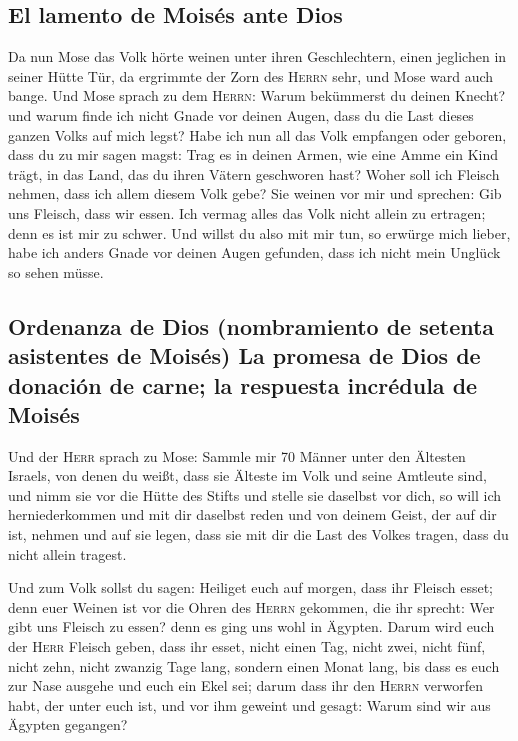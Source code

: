\hypertarget{el-lamento-de-moisuxe9s-ante-dios}{%
\subsection{El lamento de Moisés ante
Dios}\label{el-lamento-de-moisuxe9s-ante-dios}}

 Da nun Mose das Volk hörte weinen unter ihren
Geschlechtern, einen jeglichen in seiner Hütte Tür, da ergrimmte der
Zorn des \textsc{Herrn} sehr, und Mose ward auch bange. 
Und Mose sprach zu dem \textsc{Herrn}: Warum bekümmerst du deinen
Knecht? und warum finde ich nicht Gnade vor deinen Augen, dass du die
Last dieses ganzen Volks auf mich legst?  Habe ich nun
all das Volk empfangen oder geboren, dass du zu mir sagen magst: Trag es
in deinen Armen, wie eine Amme ein Kind trägt, in das Land, das du ihren
Vätern geschworen hast?  Woher soll ich Fleisch nehmen,
dass ich allem diesem Volk gebe? Sie weinen vor mir und sprechen: Gib
uns Fleisch, dass wir essen.  Ich vermag alles das Volk
nicht allein zu ertragen; denn es ist mir zu schwer.  Und
willst du also mit mir tun, so erwürge mich lieber, habe ich anders
Gnade vor deinen Augen gefunden, dass ich nicht mein Unglück so sehen
müsse.

\hypertarget{ordenanza-de-dios-nombramiento-de-setenta-asistentes-de-moisuxe9s-la-promesa-de-dios-de-donaciuxf3n-de-carne-la-respuesta-incruxe9dula-de-moisuxe9s}{%
\subsection{Ordenanza de Dios (nombramiento de setenta asistentes de
Moisés) La promesa de Dios de donación de carne; la respuesta incrédula
de
Moisés}\label{ordenanza-de-dios-nombramiento-de-setenta-asistentes-de-moisuxe9s-la-promesa-de-dios-de-donaciuxf3n-de-carne-la-respuesta-incruxe9dula-de-moisuxe9s}}

 Und der \textsc{Herr} sprach zu Mose: Sammle mir 70
Männer unter den Ältesten Israels, von denen du weißt, dass sie Älteste
im Volk und seine Amtleute sind, und nimm sie vor die Hütte des Stifts
und stelle sie daselbst vor dich,  so will ich
herniederkommen und mit dir daselbst reden und von deinem Geist, der auf
dir ist, nehmen und auf sie legen, dass sie mit dir die Last des Volkes
tragen, dass du nicht allein tragest.

 Und zum Volk sollst du sagen: Heiliget euch auf morgen,
dass ihr Fleisch esset; denn euer Weinen ist vor die Ohren des
\textsc{Herrn} gekommen, die ihr sprecht: Wer gibt uns Fleisch zu essen?
denn es ging uns wohl in Ägypten. Darum wird euch der \textsc{Herr}
Fleisch geben, dass ihr esset,  nicht einen Tag, nicht
zwei, nicht fünf, nicht zehn, nicht zwanzig Tage lang, 
sondern einen Monat lang, bis dass es euch zur Nase ausgehe und euch ein
Ekel sei; darum dass ihr den \textsc{Herrn} verworfen habt, der unter
euch ist, und vor ihm geweint und gesagt: Warum sind wir aus Ägypten
gegangen?

